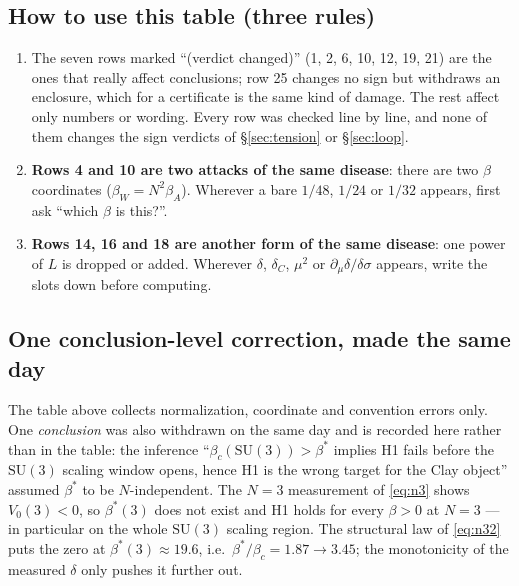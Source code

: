 \subsection*{How to use this table (three rules)}

\begin{enumerate}[label=(\roman*)]
\item The seven rows marked ``(verdict changed)'' (1, 2, 6, 10, 12, 19, 21) are the ones that really
      affect conclusions; row 25 changes no sign but withdraws an enclosure, which for a certificate is
      the same kind of damage. The rest affect only numbers or wording. Every row was checked line by
      line, and none of them changes the sign verdicts of \S\ref{sec:tension} or \S\ref{sec:loop}. \LT
\item \textbf{Rows 4 and 10 are two attacks of the same disease}: there are two $\beta$ coordinates
      ($\beta_W=N^{2}\beta_A$). Wherever a bare $1/48$, $1/24$ or $1/32$ appears, first ask ``which
      $\beta$ is this?''. \LT
\item \textbf{Rows 14, 16 and 18 are another form of the same disease}: one power of $L$ is dropped or
      added. Wherever $\delta$, $\delta_C$, $\mu^{2}$ or $\partial_\mu\delta/\delta\sigma$ appears,
      write the slots down before computing. \LT
\end{enumerate}

\subsection*{One conclusion-level correction, made the same day}

The table above collects normalization, coordinate and convention errors only. One \emph{conclusion}
was also withdrawn on the same day and is recorded here rather than in the table: the inference
``$\beta_c(\mathrm{SU}(3))>\beta^{*}$ implies H1 fails before the $\mathrm{SU}(3)$ scaling window opens,
hence H1 is the wrong target for the Clay object'' assumed $\beta^{*}$ to be $N$-independent. The $N=3$
measurement of \eqref{eq:n3} shows $V_0(3)<0$, so $\beta^{*}(3)$ does not exist and H1 holds for every
$\beta>0$ at $N=3$ --- in particular on the whole $\mathrm{SU}(3)$ scaling region. The structural law of
\eqref{eq:n32} puts the zero at $\beta^{*}(3)\approx19.6$, i.e.\ $\beta^{*}/\beta_c=1.87\to3.45$; the
monotonicity of the measured $\delta$ only pushes it further out. \LE
{}

